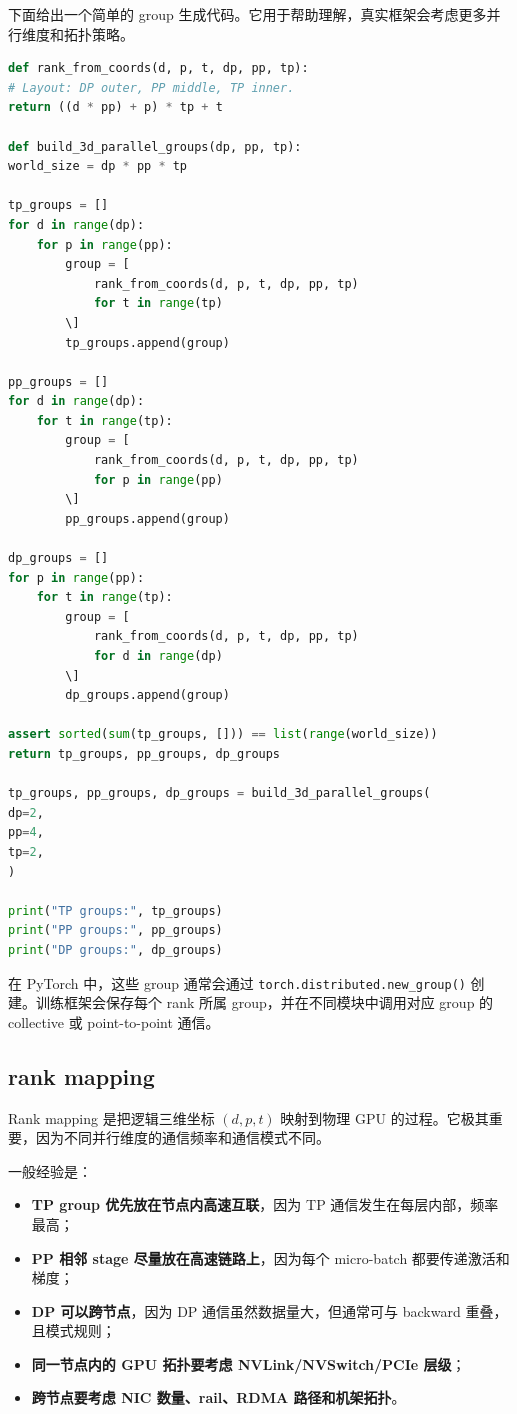 下面给出一个简单的 group 生成代码。它用于帮助理解，真实框架会考虑更多并行维度和拓扑策略。

\begin{lstlisting}[language=Python,caption={3D 并行中 TP/PP/DP groups 的生成示意},label={lst:3d-parallel-group-generation}]
def rank_from_coords(d, p, t, dp, pp, tp):
# Layout: DP outer, PP middle, TP inner.
return ((d * pp) + p) * tp + t

def build_3d_parallel_groups(dp, pp, tp):
world_size = dp * pp * tp

tp_groups = []
for d in range(dp):
    for p in range(pp):
        group = [
            rank_from_coords(d, p, t, dp, pp, tp)
            for t in range(tp)
        \]
        tp_groups.append(group)

pp_groups = []
for d in range(dp):
    for t in range(tp):
        group = [
            rank_from_coords(d, p, t, dp, pp, tp)
            for p in range(pp)
        \]
        pp_groups.append(group)

dp_groups = []
for p in range(pp):
    for t in range(tp):
        group = [
            rank_from_coords(d, p, t, dp, pp, tp)
            for d in range(dp)
        \]
        dp_groups.append(group)

assert sorted(sum(tp_groups, [])) == list(range(world_size))
return tp_groups, pp_groups, dp_groups

tp_groups, pp_groups, dp_groups = build_3d_parallel_groups(
dp=2,
pp=4,
tp=2,
)

print("TP groups:", tp_groups)
print("PP groups:", pp_groups)
print("DP groups:", dp_groups)
\end{lstlisting}

在 PyTorch 中，这些 group 通常会通过 \texttt{torch.distributed.new_group()} 创建。训练框架会保存每个 rank 所属 group，并在不同模块中调用对应 group 的 collective 或 point-to-point 通信。

\subsection{rank mapping}
\label{subsec:rank-mapping}

Rank mapping 是把逻辑三维坐标 $(d,p,t)$ 映射到物理 GPU 的过程。它极其重要，因为不同并行维度的通信频率和通信模式不同。

一般经验是：

\begin{itemize}
\item \textbf{TP group 优先放在节点内高速互联}，因为 TP 通信发生在每层内部，频率最高；
\item \textbf{PP 相邻 stage 尽量放在高速链路上}，因为每个 micro-batch 都要传递激活和梯度；
\item \textbf{DP 可以跨节点}，因为 DP 通信虽然数据量大，但通常可与 backward 重叠，且模式规则；
\item \textbf{同一节点内的 GPU 拓扑要考虑 NVLink/NVSwitch/PCIe 层级}；
\item \textbf{跨节点要考虑 NIC 数量、rail、RDMA 路径和机架拓扑}。
\end{itemize}

